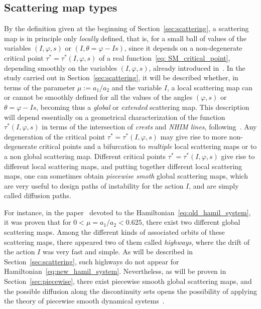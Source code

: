 \documentclass[a4paper,10pt]{article}
\theoremstyle{definition}
\begin{document}
\subsection{Scattering map types}
By the definition given at the beginning of Section~\ref{sec:scattering}, a scattering map is
in principle only \emph{locally} defined, that is, for a small ball of values of the variables
$(I,\varphi,s)$ or $(I,\theta=\varphi-Is)$, since it depends on a non-degenerate critical point
$\tau^*=\tau^*(I,\varphi,s)$ of a real function~\eqref{eq: SM_critical_point}, depending smoothly
on the variables $(I,\varphi,s)$, already introduced in~\cite{Seara2006}.
In the study carried out in Section~\ref{sec:scattering}, it
will be described whether, in terms of the parameter $\mu:=a_1/a_2$ and the variable $I$, a local
scattering map can or cannot be smoothly defined for all the values of the angles $(\varphi,s)$ or
$\theta=\varphi-Is$, becoming thus a \emph{global} or \emph{extended} scattering map. This description will depend essentially
on a geometrical characterization of the function~$\tau^*(I,\varphi,s)$ in terms of the
intersection of \emph{crests} and \emph{NHIM lines}, following~\cite{Delshams2011}.
Any degeneration of the critical point $\tau^*=\tau^*(I,\varphi,s)$ may give rise to more
non-degenerate critical points and a bifurcation to \emph{multiple} local scattering maps
or to a non global scattering map. Different critical points $\tau^*=\tau^*(I,\varphi,s)$
give rise to different local scattering maps, and putting together different local scattering maps,
one can sometimes obtain \emph{piecewise smoth} global scattering maps, which are very useful
to design paths of instability for the action $I$, and are simply called diffusion paths.

For instance, in the paper~\cite{Delshams2017} devoted to the Hamiltonian~\eqref{eq:old_hamil_system},
it was proven that for $0<\mu=a_1/a_2<0.625$, there exist two different global scattering maps.
Among the different kinds of associated orbits of these scattering maps, there appeared
two of them called \emph{highways}, where the drift of the action $I$ was very fast and simple.
As will be described in Section~\ref{sec:scattering}, such highways do not appear for
Hamiltonian~\eqref{eq:new_hamil_system}. Nevertheless, as will be proven in Section~\ref{sec:piecewise},
there exist piecewise smooth global scattering maps, and the possible diffusion along
the discontinuity sets opens the possibility of applying the theory of
piecewise smooth dynamical systems~\cite{Filippov88}.
\end{document}

